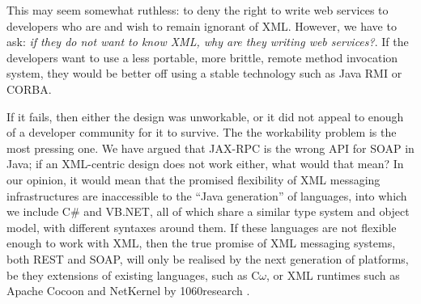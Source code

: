 This may seem somewhat ruthless: to deny the right to write web
services to developers who are and wish to remain ignorant of XML.
However, we have to ask: \emph{if they do not want to know XML, why are
they writing web services?}. If the developers want to use a less portable,
more brittle, remote method invocation system, they would be better off
using a stable technology such as Java RMI or CORBA.

If it fails, then either the design was unworkable, or it did not
appeal to enough of a developer community for it to survive. The the
workability problem is the most pressing one. We have argued that
JAX-RPC is the wrong API for SOAP in Java; if an XML-centric design
does not work either, what would that mean? In our opinion, it would
mean that the promised flexibility of XML messaging infrastructures
are inaccessible to the ``Java generation'' of languages, into which
we include C\# and VB.NET, all of which share a similar type system
and object model, with different syntaxes around them. If these
languages are not flexible enough to work with XML, then the true
promise of XML messaging systems, both REST and SOAP, will only be
realised by the next generation of platforms, be they extensions of
existing languages, such as C$\omega$, or XML runtimes such as Apache
Cocoon and NetKernel by 1060research
\cite{MSFT:TransitionsInProgrammingModels,pjr:NKonTSS}.
